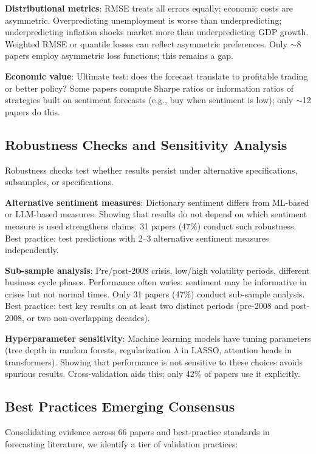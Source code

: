 \documentclass[11pt]{article}
\begin{document}
\textbf{Distributional metrics}: RMSE treats all errors equally; economic costs are asymmetric. Overpredicting unemployment is worse than underpredicting; underpredicting inflation shocks market more than underpredicting GDP growth. Weighted RMSE or quantile losses can reflect asymmetric preferences. Only $\sim$8 papers employ asymmetric loss functions; this remains a gap.

\textbf{Economic value}: Ultimate test: does the forecast translate to profitable trading or better policy? Some papers compute Sharpe ratios or information ratios of strategies built on sentiment forecasts (e.g., buy when sentiment is low); only $\sim$12 papers do this.

\subsection{Robustness Checks and Sensitivity Analysis}

Robustness checks test whether results persist under alternative specifications, subsamples, or specifications.

\textbf{Alternative sentiment measures}: Dictionary sentiment differs from ML-based or LLM-based measures. Showing that results do not depend on which sentiment measure is used strengthens claims. 31 papers (47\%) conduct such robustness. Best practice: test predictions with 2--3 alternative sentiment measures independently.

\textbf{Sub-sample analysis}: Pre/post-2008 crisis, low/high volatility periods, different business cycle phases. Performance often varies: sentiment may be informative in crises but not normal times. Only 31 papers (47\%) conduct sub-sample analysis. Best practice: test key results on at least two distinct periods (pre-2008 and post-2008, or two non-overlapping decades).

\textbf{Hyperparameter sensitivity}: Machine learning models have tuning parameters (tree depth in random forests, regularization $\lambda$ in LASSO, attention heads in transformers). Showing that performance is not sensitive to these choices avoids spurious results. Cross-validation aids this; only 42\% of papers use it explicitly.

\subsection{Best Practices Emerging Consensus}

Consolidating evidence across 66 papers and best-practice standards in forecasting literature, we identify a tier of validation practices:
\end{document}
